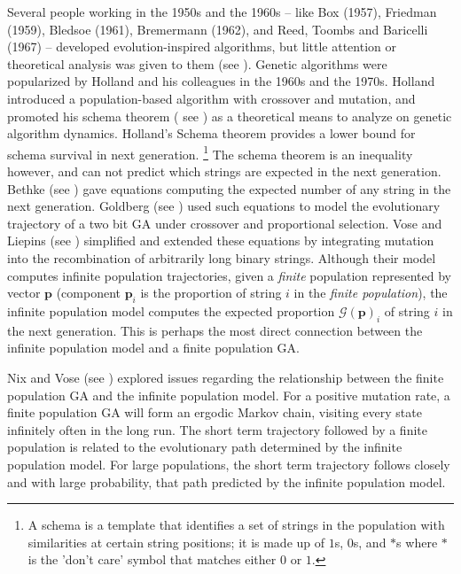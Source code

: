 Several people working in the 1950s and the 1960s -- like Box (1957), Friedman (1959),
Bledsoe (1961), Bremermann (1962), and Reed, Toombs and Baricelli (1967) -- developed evolution-inspired algorithms, 
but little attention or theoretical analysis was given to them (see \cite{Mitchell1999}). Genetic algorithms were popularized by Holland 
and his colleagues in the 1960s and the 1970s. Holland introduced a population-based algorithm with crossover and mutation, 
and promoted his schema theorem ( see \cite{Holland1975}) as a theoretical means to analyze on genetic algorithm dynamics. 
Holland's Schema theorem provides a lower bound for schema survival in 
next generation. \footnote{A schema is a template that identifies a set of strings in the population with similarities 
at certain string positions; it is made up of $1$s, $0$s, and $\ast$s where 
$\ast$ is the 'don't care' symbol that matches either $0$ or $1$.} The schema theorem is an inequality however, 
and can not predict which strings are expected in the next generation. 
Bethke (see \cite{Bethke1981}) gave equations computing the expected number of any string in the next generation. 
Goldberg (see \cite{Goldberg1987}) used such equations 
to model the evolutionary trajectory of a two bit GA under crossover 
and proportional selection. Vose and Liepins (see \cite{VoseLiepins1991}) simplified and extended 
these equations by integrating mutation into the recombination of arbitrarily long binary strings. 
Although their model computes infinite population trajectories, given a {\em finite} population represented by vector $\bm{p}$  
(component $\bm{p}_i$ is the proportion of string $i$ in the {\em finite population}), the infinite population model 
computes the expected proportion $\mathcal{G}(\bm{p})_i$ of string $i$ in the next generation.  This is perhaps the most 
direct connection between the infinite population model and a finite population GA.

Nix and Vose (see \cite{Nix1992}) explored issues regarding the relationship between the finite population GA and the infinite population model. 
For a positive mutation rate, a finite population GA will form an ergodic Markov chain, visiting every state infinitely often in the long run.
The short term trajectory followed by a finite population is related to 
the evolutionary path determined by the infinite population model. 
For large populations, the short term trajectory follows closely and 
with large probability, that path predicted by 
the infinite population model. 

